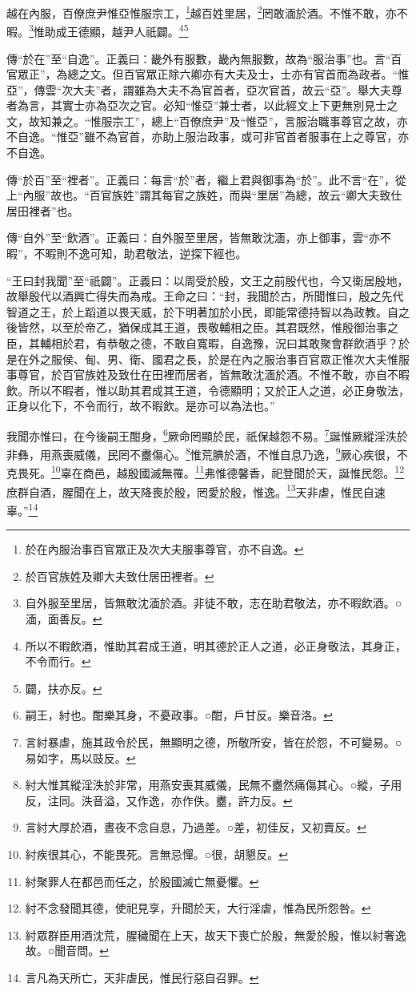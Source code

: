 越在內服，百僚庶尹惟亞惟服宗工，\footnote{於在內服治事百官眾正及次大夫服事尊官，亦不自逸。}越百姓里居，\footnote{於百官族姓及卿大夫致仕居田裡者。}罔敢湎於酒。不惟不敢，亦不暇。\footnote{自外服至里居，皆無敢沈湎於酒。非徒不敢，志在助君敬法，亦不暇飲酒。○湎，面善反。}惟助成王德顯，越尹人祇闢。\footnote{所以不暇飲酒，惟助其君成王道，明其德於正人之道，必正身敬法，其身正，不令而行。}\footnote{闢，扶亦反。}

{\noindent\zhuan{}\fzbyks 傳“於在”至“自逸”。正義曰：畿外有服數，畿內無服數，故為“服治事”也。言“百官眾正”，為總之文。但百官眾正除六卿亦有大夫及士，士亦有官首而為政者。“惟亞”，傳雲“次大夫”者，謂雖為大夫不為官首者，亞次官首，故云“亞”。舉大夫尊者為言，其實士亦為亞次之官。必知“惟亞”兼士者，以此經文上下更無別見士之文，故知兼之。“惟服宗工”，總上“百僚庶尹”及“惟亞”，言服治職事尊官之故，亦不自逸。“惟亞”雖不為官首，亦助上服治政事，或可非官首者服事在上之尊官，亦不自逸。 \par}

{\noindent\zhuan{}\fzbyks 傳“於百”至“裡者”。正義曰：每言“於”者，繼上君與御事為“於”。此不言“在”，從上“內服”故也。“百官族姓”謂其每官之族姓，而與“里居”為總，故云“卿大夫致仕居田裡者”也。 \par}

{\noindent\zhuan{}\fzbyks 傳“自外”至“飲酒”。正義曰：自外服至里居，皆無敢沈湎，亦上御事，雲“亦不暇”，不暇則不逸可知，助君敬法，逆探下經也。 \par}

{\noindent\shu{}\fzkt “王曰封我聞”至“祇闢”。正義曰：以周受於殷，文王之前殷代也，今又衛居殷地，故舉殷代以酒興亡得失而為戒。王命之曰：“封，我聞於古，所聞惟曰，殷之先代智道之王，於上蹈道以畏天威，於下明著加於小民，即能常德持智以為政教。自之後皆然，以至於帝乙，猶保成其王道，畏敬輔相之臣。其君既然，惟殷御治事之臣，其輔相於君，有恭敬之德，不敢自寬暇，自逸豫，況曰其敢聚會群飲酒乎？於是在外之服侯、甸、男、衛、國君之長，於是在內之服治事百官眾正惟次大夫惟服事尊官，於百官族姓及致仕在田裡而居者，皆無敢沈湎於酒。不惟不敢，亦自不暇飲。所以不暇者，惟以助其君成其王道，令德顯明；又於正人之道，必正身敬法，正身以化下，不令而行，故不暇飲。是亦可以為法也。” \par}

我聞亦惟曰，在今後嗣王酣身，\footnote{嗣王，紂也。酣樂其身，不憂政事。○酣，戶甘反。樂音洛。}厥命罔顯於民，祇保越怨不易。\footnote{言紂暴虐，施其政令於民，無顯明之德，所敬所安，皆在於怨，不可變易。○易如字，馬以豉反。}誕惟厥縱淫泆於非彝，用燕喪威儀，民罔不衋傷心。\footnote{紂大惟其縱淫泆於非常，用燕安喪其威儀，民無不衋然痛傷其心。○縱，子用反，注同。泆音溢，又作逸，亦作佚。衋，許力反。}惟荒腆於酒，不惟自息乃逸，\footnote{言紂大厚於酒，晝夜不念自息，乃過差。○差，初佳反，又初賣反。}厥心疾很，不克畏死。\footnote{紂疾很其心，不能畏死。言無忌憚。○很，胡懇反。}辜在商邑，越殷國滅無罹。\footnote{紂聚罪人在都邑而任之，於殷國滅亡無憂懼。}弗惟德馨香，祀登聞於天，誕惟民怨。\footnote{紂不念發聞其德，使祀見享，升聞於天，大行淫虐，惟為民所怨咎。}庶群自酒，腥聞在上，故天降喪於殷，罔愛於殷，惟逸。\footnote{紂眾群臣用酒沈荒，腥穢聞在上天，故天下喪亡於殷，無愛於殷，惟以紂奢逸故。○聞音問。}天非虐，惟民自速辜。”\footnote{言凡為天所亡，天非虐民，惟民行惡自召罪。}


